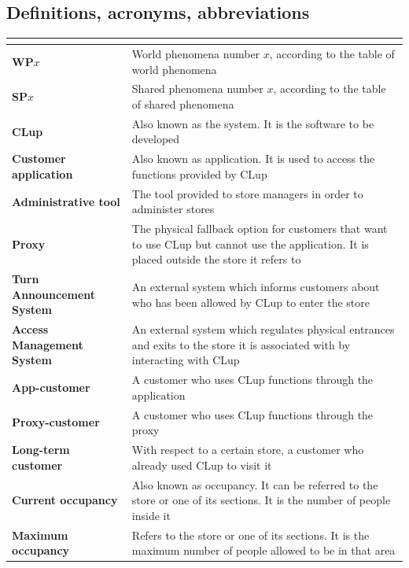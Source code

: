\documentclass[a4paper,oneside,11pt]{book}   %
\begin{document}
    \subsection{Definitions, acronyms, abbreviations}
    \begin{longtable}[c] { |>{\bfseries{}}C{0.25\textwidth}|H{0.55\textwidth}| }
        \hline
         \\
        \hline
        WP\boldmath$x$ & World phenomena number $x$, according to the table of world phenomena \\ \hline
        SP\boldmath$x$ & Shared phenomena number $x$, according to the table of shared phenomena \\ \hline
        CLup & Also known as the system. It is the software to be developed \\ \hline
        Customer application & Also known as application. It is used to access the functions provided by CLup \\ \hline
        Administrative tool & The tool provided to store managers in order to administer stores \\ \hline
        Proxy & The physical fallback option for customers that want to use CLup but cannot use the application. It is placed outside the store it refers to \\ \hline
        Turn Announcement System & An external system which informs customers about who has been allowed by CLup to enter the store \\ \hline
        Access Management System & An external system which regulates physical entrances and exits to the store it is associated with by interacting with CLup \\ \hline
        App-customer & A customer who uses CLup functions through the application \\ \hline
        Proxy-customer & A customer who uses CLup functions through the proxy \\ \hline
        Long-term customer & With respect to a certain store, a customer who already used CLup to visit it \\ \hline
        Current occupancy & Also known as occupancy. It can be referred to the store or one of its sections. It is the number of people inside it \\ \hline
        Maximum occupancy & Refers to the store or one of its sections. It is the maximum number of people allowed to be in that area \\ \hline

\end{longtable}
\end{document}
